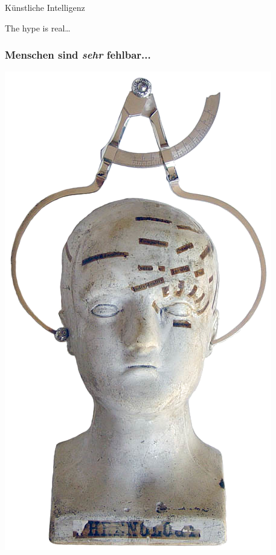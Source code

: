 \documentclass[aspectratio=43,x11names]{beamer}
\begin{document}


\begin{frame}
\begin{center}
\huge
Künstliche Intelligenz
\bigskip

\large
The hype is real\dots
\end{center}
\end{frame}

\begin{frame}
\frametitle{Menschen sind \emph{sehr} fehlbar...}
\begin{minipage}{0.45\textwidth}
\begin{center}
\includegraphics[keepaspectratio, height=0.7\textheight]{images/calipers_transparent}

\end{center}
\end{minipage}
\end{frame}
\end{document}
